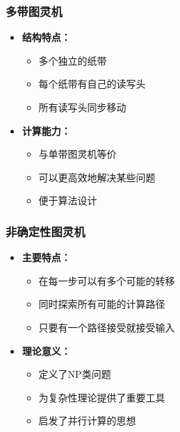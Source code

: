 \documentclass[a4paper,12pt]{ctexart}
\begin{document}
\subsubsection{多带图灵机}
\begin{itemize}
    \item \textbf{结构特点：}
        \begin{itemize}
            \item 多个独立的纸带
            \item 每个纸带有自己的读写头
            \item 所有读写头同步移动
        \end{itemize}
    \item \textbf{计算能力：}
        \begin{itemize}
            \item 与单带图灵机等价
            \item 可以更高效地解决某些问题
            \item 便于算法设计
        \end{itemize}
\end{itemize}

\subsubsection{非确定性图灵机}
\begin{itemize}
    \item \textbf{主要特点：}
        \begin{itemize}
            \item 在每一步可以有多个可能的转移
            \item 同时探索所有可能的计算路径
            \item 只要有一个路径接受就接受输入
        \end{itemize}
    \item \textbf{理论意义：}
        \begin{itemize}
            \item 定义了NP类问题
            \item 为复杂性理论提供了重要工具
            \item 启发了并行计算的思想
        \end{itemize}
\end{itemize}
\end{document}
